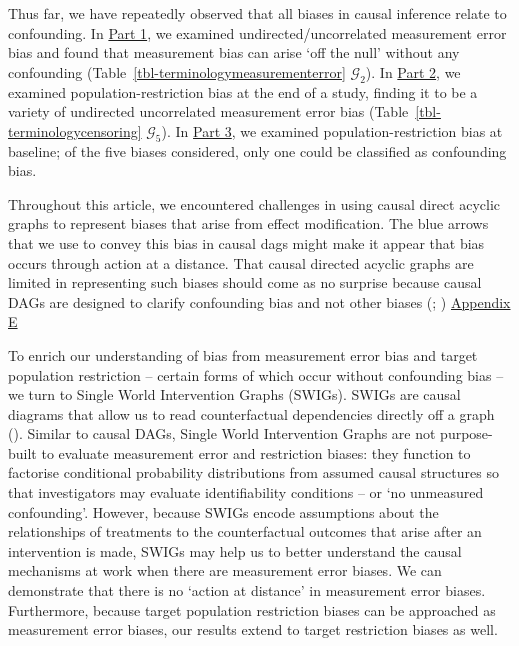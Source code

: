 \documentclass[
  single column]{article}
\begin{document}
Thus far, we have repeatedly observed that all biases in causal
inference relate to confounding. In \hyperref[id-sec-1]{Part 1}, we
examined undirected/uncorrelated measurement error bias and found that
measurement bias can arise `off the null' without any confounding
(Table~\ref{tbl-terminologymeasurementerror} \(\mathcal{G}_2\)). In
\hyperref[id-sec-2]{Part 2}, we examined population-restriction bias at
the end of a study, finding it to be a variety of undirected
uncorrelated measurement error bias
(Table~\ref{tbl-terminologycensoring} \(\mathcal{G}_5\)). In
\hyperref[id-sec-3]{Part 3}, we examined population-restriction bias at
baseline; of the five biases considered, only one could be classified as
confounding bias.

Throughout this article, we encountered challenges in using causal
direct acyclic graphs to represent biases that arise from effect
modification. The blue arrows that we use to convey this bias in causal
dags might make it appear that bias occurs through action at a distance.
That causal directed acyclic graphs are limited in representing such
biases should come as no surprise because causal DAGs are designed to
clarify confounding bias and not other biases
(;
) \hyperref[id-app_E]{Appendix E}

To enrich our understanding of bias from measurement error bias and
target population restriction -- certain forms of which occur without
confounding bias -- we turn to Single World Intervention Graphs (SWIGs).
SWIGs are causal diagrams that allow us to read counterfactual
dependencies directly off a graph
(). Similar to
causal DAGs, Single World Intervention Graphs are not purpose-built to
evaluate measurement error and restriction biases: they function to
factorise conditional probability distributions from assumed causal
structures so that investigators may evaluate identifiability conditions
-- or `no unmeasured confounding'. However, because SWIGs encode
assumptions about the relationships of treatments to the counterfactual
outcomes that arise after an intervention is made, SWIGs may help us to
better understand the causal mechanisms at work when there are
measurement error biases. We can demonstrate that there is no `action at
distance' in measurement error biases. Furthermore, because target
population restriction biases can be approached as measurement error
biases, our results extend to target restriction biases as well.
\end{document}

